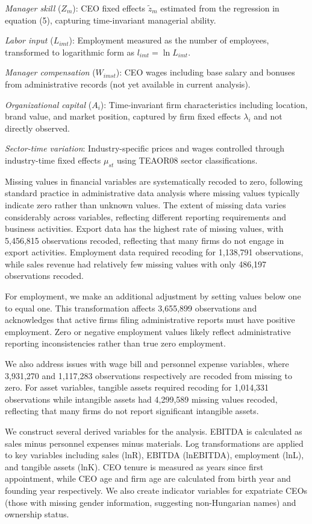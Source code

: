 \documentclass[11pt,a4paper]{article}
\begin{document}
\textit{Manager skill} ($Z_m$): CEO fixed effects $\tilde{z}_m$ estimated from the regression in equation (5), capturing time-invariant managerial ability.

\textit{Labor input} ($L_{imt}$): Employment measured as the number of employees, transformed to logarithmic form as $l_{imt} = \ln L_{imt}$.

\textit{Manager compensation} ($W_{imst}$): CEO wages including base salary and bonuses from administrative records (not yet available in current analysis).

\textit{Organizational capital} ($A_i$): Time-invariant firm characteristics including location, brand value, and market position, captured by firm fixed effects $\lambda_i$ and not directly observed.

\textit{Sector-time variation}: Industry-specific prices and wages controlled through industry-time fixed effects $\mu_{st}$ using TEAOR08 sector classifications.



Missing values in financial variables are systematically recoded to zero, following standard practice in administrative data analysis where missing values typically indicate zero rather than unknown values. The extent of missing data varies considerably across variables, reflecting different reporting requirements and business activities. Export data has the highest rate of missing values, with 5,456,815 observations recoded, reflecting that many firms do not engage in export activities. Employment data required recoding for 1,138,791 observations, while sales revenue had relatively few missing values with only 486,197 observations recoded.

For employment, we make an additional adjustment by setting values below one to equal one. This transformation affects 3,655,899 observations and acknowledges that active firms filing administrative reports must have positive employment. Zero or negative employment values likely reflect administrative reporting inconsistencies rather than true zero employment.

We also address issues with wage bill and personnel expense variables, where 3,931,270 and 1,117,283 observations respectively are recoded from missing to zero. For asset variables, tangible assets required recoding for 1,014,331 observations while intangible assets had 4,299,589 missing values recoded, reflecting that many firms do not report significant intangible assets.

We construct several derived variables for the analysis. EBITDA is calculated as sales minus personnel expenses minus materials. Log transformations are applied to key variables including sales (lnR), EBITDA (lnEBITDA), employment (lnL), and tangible assets (lnK). CEO tenure is measured as years since first appointment, while CEO age and firm age are calculated from birth year and founding year respectively. We also create indicator variables for expatriate CEOs (those with missing gender information, suggesting non-Hungarian names) and ownership status.
\end{document}
